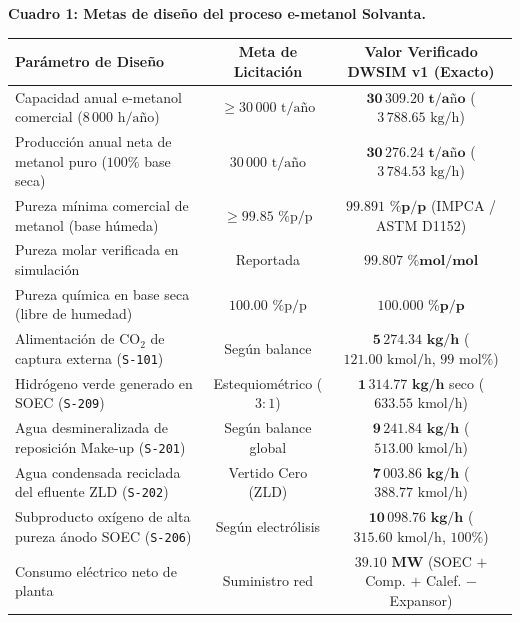 \documentclass[11pt,letterpaper]{article}
\begin{document}
\begin{center}
\small
\textbf{Cuadro 1: Metas de diseño del proceso e-metanol Solvanta.}\\[3pt]
\begin{tabularx}{\textwidth}{Xcc}
\toprule
\textbf{Parámetro de Diseño} & \textbf{Meta de Licitación} & \textbf{Valor Verificado DWSIM v1 (Exacto)} \\
\midrule
Capacidad anual e-metanol comercial ($8\,000\text{ h/año}$) & $\ge 30\,000\text{ t/año}$ & $\mathbf{30\,309.20\text{ t/año}}$ ($3\,788.65\text{ kg/h}$) \\
Producción anual neta de metanol puro ($100\%$ base seca) & $30\,000\text{ t/año}$ & $\mathbf{30\,276.24\text{ t/año}}$ ($3\,784.53\text{ kg/h}$) \\
Pureza mínima comercial de metanol (base húmeda) & $\ge 99.85\text{ \% p/p}$ & $\mathbf{99.891\text{ \% p/p}}$ (IMPCA / ASTM D1152) \\
Pureza molar verificada en simulación & Reportada & $\mathbf{99.807\text{ \% mol/mol}}$ \\
Pureza química en base seca (libre de humedad) & $100.00\text{ \% p/p}$ & $\mathbf{100.000\text{ \% p/p}}$ \\
Alimentación de $\text{CO}_2$ de captura externa (\texttt{S-101}) & Según balance & $\mathbf{5\,274.34\text{ kg/h}}$ ($121.00\text{ kmol/h}$, $99\text{ mol\%}$) \\
Hidrógeno verde generado en SOEC (\texttt{S-209}) & Estequiométrico ($3:1$) & $\mathbf{1\,314.77\text{ kg/h}}$ seco ($633.55\text{ kmol/h}$) \\
Agua desmineralizada de reposición Make-up (\texttt{S-201})& Según balance global & $\mathbf{9\,241.84\text{ kg/h}}$ ($513.00\text{ kmol/h}$) \\
Agua condensada reciclada del efluente ZLD (\texttt{S-202})& Vertido Cero (ZLD) & $\mathbf{7\,003.86\text{ kg/h}}$ ($388.77\text{ kmol/h}$) \\
Subproducto oxígeno de alta pureza ánodo SOEC (\texttt{S-206}) & Según electrólisis & $\mathbf{10\,098.76\text{ kg/h}}$ ($315.60\text{ kmol/h}$, $100\%$) \\
Consumo eléctrico neto de planta & Suministro red & $\mathbf{39.10\text{ MW}}$ (SOEC $+$ Comp. $+$ Calef. $-$ Expansor) \\
\bottomrule
\end{tabularx}
\end{center}

\clearpage

\end{document}
